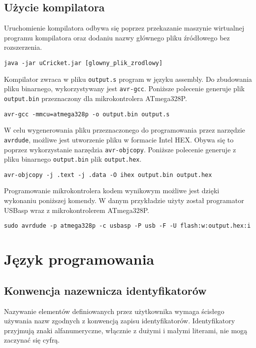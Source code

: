 \subsection{Użycie kompilatora}
Uruchomienie kompilatora odbywa się poprzez przekazanie maszynie wirtualnej programu kompilatora oraz dodaniu nazwy głównego pliku źródłowego bez rozszerzenia.
\begin{lstlisting}
java -jar uCricket.jar [glowny_plik_zrodlowy]
\end{lstlisting}
Kompilator zwraca w pliku \lstinline|output.s|  program w języku assembly. Do zbudowania pliku binarnego, wykorzystywany jest \lstinline|avr-gcc|. Poniższe polecenie generuje plik \lstinline|output.bin| przeznaczony dla mikrokontrolera ATmega328P.
\begin{lstlisting}
avr-gcc -mmcu=atmega328p -o output.bin output.s
\end{lstlisting}
W celu wygenerowania pliku przeznaczonego do programowania przez narzędzie \lstinline|avrdude|, możliwe jest utworzenie pliku w formacie Intel HEX. Obywa się to poprzez wykorzystanie narzędzia \lstinline|avr-objcopy|. Poniższe polecenie generuje z pliku binarnego \lstinline|output.bin| plik \lstinline|output.hex|.
\begin{lstlisting}
avr-objcopy -j .text -j .data -O ihex output.bin output.hex
\end{lstlisting}
Programowanie mikrokontrolera kodem wynikowym możliwe jest dzięki wykonaniu poniższej komendy. W danym przykładzie użyty został programator USBasp wraz z mikrokontrolerem ATmega328P.
\begin{lstlisting}
sudo avrdude -p atmega328p -c usbasp -P usb -F -U flash:w:output.hex:i
\end{lstlisting}

\section{Język programowania}
\subsection{Konwencja nazewnicza identyfikatorów}
Nazywanie elementów definiowanych przez użytkownika wymaga ścisłego używania nazw zgodnych z konwencją zapisu identyfikatorów. Identyfikatory przyjmują znaki alfanumeryczne, włącznie z dużymi i małymi literami, nie mogą zaczynać się cyfrą. 

